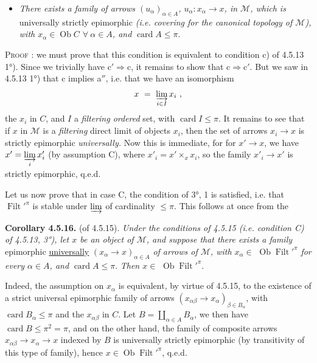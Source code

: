 \documentclass[11pt]{article}
\newcommand{\printedpage}[1]{\marginpar{\footnotesize p.~#1}}
\newcommand{\msp}[1]{\marginpar{\footnotesize [#1]}}
\newcommand{\Filt}{\operatorname{Filt}}
\newcommand{\card}{\operatorname{card}}
\newcommand{\Ob}{\operatorname{Ob}}
\begin{document}
\printedpage{43}
\begin{itemize}
\item[\textit{c$'$)}] \textit{There exists a family of arrows $(u_{\alpha})_{\alpha\in A}$, $u_{\alpha} : x_{\alpha} \longrightarrow x$, in $\mathcal{M}$, which is} universally strictly epimorphic \textit{(i.e. covering for the canonical topology of $\mathcal{M}$), with $x_{\alpha} \in \Ob C$ $\forall\ \alpha \in A$, and} $\card A \leqslant \pi$.
\end{itemize}
\textsc{Proof} : we must prove that this condition is equivalent to condition c) of 4.5.13 1°). Since we trivially have $\mathrm{c}' \Longrightarrow \mathrm{c}$, it remains to show that $\mathrm{c} \Longrightarrow \mathrm{c}'$. But we saw in 4.5.13 1°) that c implies a$''$, i.e. that we have an isomorphism
\[ x \ = \ \varinjlim_{i\in I} x_i \ , \]
the $x_i$ in $C$, and $I$ a \textit{filtering ordered} set, with $\card I \leqslant \pi$. It remains to see that if $x$ in $\mathcal{M}$ is a \textit{filtering} direct limit of objects $x_i$, then the set of arrows $x_i \longrightarrow x$ is strictly epimorphic \textit{universally.} Now this is immediate, for for $x' \longrightarrow x$, we have $x' = \varinjlim\limits_{i} x'_i$ (by assumption C), where $x'_i = x' \times_x x_i$, so the family $x'_i \longrightarrow x'$ is strictly epimorphic, q.e.d.

Let us now prove that in case C, the condition of 3°, 1 is satisfied, i.e. that $\Filt'^{\pi}$ is stable under $\varinjlim$ of cardinality $\leqslant \pi$. This
\msp{page 137}
follows at once from the

\textbf{Corollary 4.5.16.} (of 4.5.15). \textit{Under the conditions of 4.5.15 (i.e. condition C) of 4.5.13, 3°), let $x$ be an object of $\mathcal{M}$, and suppose that there exists a family} epimorphic \underline{universally} $(x_{\alpha} \longrightarrow x)_{\alpha\in A}$ \textit{of arrows of $\mathcal{M}$, with $x_{\alpha} \in$} $\Ob \Filt'^{\pi}$ \textit{for every $\alpha \in A$, and} $\card A \leqslant \pi$. \textit{Then $x \in$} $\Ob \Filt'^{\pi}$.

Indeed, the assumption on $x_{\alpha}$ is equivalent, by virtue of 4.5.15, to the existence of a strict universal epimorphic family of arrows $(x_{\alpha\beta} \longrightarrow x_{\alpha})_{\beta\in B_{\alpha}}$, with $\card B_{\alpha} \leqslant \pi$ and the $x_{\alpha\beta}$ in $C$. Let $B = \coprod_{\alpha\in A} B_{\alpha}$, we then have $\card B \leqslant \pi^2 = \pi$, and on the other hand, the family of composite arrows $x_{\alpha\beta} \longrightarrow x_{\alpha} \longrightarrow x$ indexed by $B$ is universally strictly epimorphic (by transitivity of this type of family), hence $x \in \Ob \Filt'^{\pi}$, q.e.d.
\end{document}
